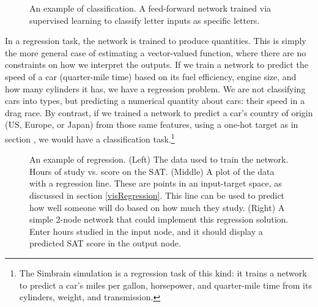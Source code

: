\begin{figure}[h]
\centering
{}
\caption[Simbrain screenshot.]{An example of classification. A feed-forward network trained via supervised learning to classify letter inputs as specific letters.}
\label{F:letter_classify}
\end{figure}

In a regression task, the network is trained to produce quantities. This is simply the more general case of estimating a vector-valued function, where there are no constraints on how we interpret the outputs. If we train a network to predict the speed of a car (quarter-mile time) based on its fuel efficiency, engine size, and how many cylinders it has, we have a regression problem. We are not classifying cars into types, but predicting a numerical quantity about cars: their speed in a drag race. By contrast, if we trained a network to predict a car's country of origin (US, Europe, or Japan) from those same features, using a one-hot target as in section , we would have a classification task.\footnote{The Simbrain simulation  is a regression task of this kind: it trains a network to predict a car's miles per gallon, horsepower, and quarter-mile time from its cylinders, weight, and transmission.}


\begin{figure}[h]
\centering
{}
\hspace*{.4in}
\hspace*{.4in}
\caption[Jeff Yoshimi.]{An example of regression. (Left) The data used to train the network. Hours of study vs. score on the SAT. (Middle) A plot of the data with a regression line. These are points in an input-target space, as discussed in section \ref{visRegression}. This line can be used to predict how well someone will do based on how much they study. (Right) A simple 2-node network that could implement this regression solution. Enter hours studied in the input node, and it should display a  predicted SAT score in the output node.}
\label{F:linearRegression}
\end{figure}

